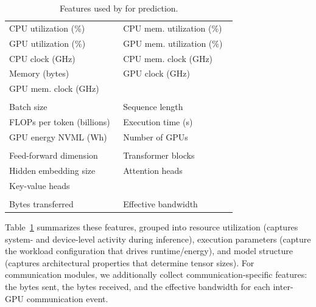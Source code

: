 \begin{table}[t]
\centering
\small
\setlength{\tabcolsep}{4pt}
\renewcommand{\arraystretch}{1.05}

\begin{tabular}{@{}
>{\raggedright\arraybackslash}p{0.48\linewidth}
>{\raggedright\arraybackslash}p{0.48\linewidth}
@{}}
\toprule
\rowcolor{rowblue}
\multicolumn{2}{@{}l@{}}{\textbf{Resource Utilization Features}}\\
\midrule
CPU utilization (\%) & CPU mem. utilization (\%)\\
\rowcolor{rowblue} GPU utilization (\%) & GPU mem. utilization (\%)\\
CPU clock (GHz) & CPU mem. clock (GHz)\\
\rowcolor{rowblue} Memory (bytes) & GPU clock (GHz)\\
GPU mem. clock (GHz) & \\
\midrule

\rowcolor{rowblue}
\multicolumn{2}{@{}l@{}}{\textbf{Execution Features}}\\
\midrule
Batch size & Sequence length\\
\rowcolor{rowblue} FLOPs per token (billions) & Execution time (s)\\
GPU energy NVML (Wh) & Number of GPUs\\
\midrule

\rowcolor{rowblue}
\multicolumn{2}{@{}l@{}}{\textbf{Model Structure Features}}\\
\midrule
Feed-forward dimension & Transformer blocks\\
\rowcolor{rowblue} Hidden embedding size & Attention heads\\
Key-value heads & \\
\midrule

\rowcolor{rowblue}
\multicolumn{2}{@{}l@{}}{\textbf{Communication Features}}\\
\midrule
Bytes transferred & Effective bandwidth \\

\bottomrule
\end{tabular}
\vspace{-9pt}
\caption{Features used by \sys{} for prediction.}
\label{tab:features}
\vspace{-17pt}
\end{table}

Table~\ref{tab:features} summarizes these features, grouped into resource utilization (captures system- and device-level activity during inference), execution parameters (capture the workload configuration that drives runtime/energy), and model structure (captures architectural properties that determine tensor sizes). 
For communication modules, we additionally collect communication-specific features: the bytes sent, the bytes received, and the effective bandwidth for each inter-GPU communication event.

